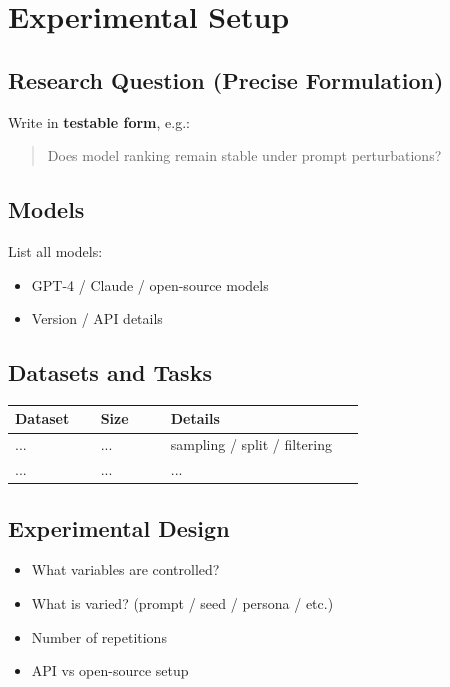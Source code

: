 \documentclass[11pt]{article}
\begin{document}
\section{Experimental Setup}

\subsection{Research Question (Precise Formulation)}

Write in \textbf{testable form}, e.g.:

\begin{quote}
Does model ranking remain stable under prompt perturbations?
\end{quote}

\subsection{Models}

List all models:
\begin{itemize}
    \item GPT-4 / Claude / open-source models
    \item Version / API details
\end{itemize}

\subsection{Datasets and Tasks}

\begin{center}
\begin{tabular}{@{}p{0.22\linewidth} p{0.18\linewidth} p{0.50\linewidth}@{}}
\toprule
\textbf{Dataset} & \textbf{Size} & \textbf{Details} \\
\midrule
... & ... & sampling / split / filtering \\
... & ... & ... \\
\bottomrule
\end{tabular}
\end{center}

\subsection{Experimental Design}

\begin{itemize}[leftmargin=*]
    \item What variables are controlled?
    \item What is varied? (prompt / seed / persona / etc.)
    \item Number of repetitions
    \item API vs open-source setup
\end{itemize}
\end{document}
